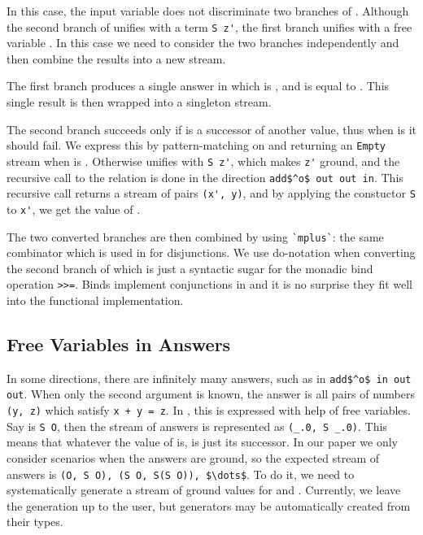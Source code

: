 In this case, the input variable \z does not discriminate two branches of \conde.
Although the second branch of \conde unifies \z with a term \lstinline{S z'}, the first branch unifies \z with a free variable \y.
In this case we need to consider the two branches independently and then combine the results into a new stream.

The first \conde branch produces a single answer in which \x is \zero, and \y is equal to \z.
This single result is then wrapped into a singleton stream.

The second \conde branch succeeds only if \z is a successor of another value, thus when \z is \zero it should fail.
We express this by pattern-matching on \z and returning an \lstinline{Empty} stream when \z is \zero.
Otherwise \z unifies with \lstinline{S z'}, which makes \lstinline{z'} ground, and the recursive call to the relation is done in the direction \lstinline{add$^o$ out out in}.
This recursive call returns a stream of pairs \lstinline{(x', y)}, and by applying the constuctor \lstinline{S} to \lstinline{x'}, we get the value of \x.

The two converted \conde branches are then combined by using \lstinline{`mplus`}: the same combinator which is used in \mk for disjunctions.
We use do-notation when converting the second branch of \conde which is just a syntactic sugar for the monadic bind operation \lstinline{>>=}.
Binds implement conjunctions in \mk and it is no surprise they fit well into the functional implementation.



\subsection{Free Variables in Answers}



In some directions, there are infinitely many answers, such as in \lstinline{add$^o$ in out out}.
When only the second argument is known, the answer is all pairs of numbers \lstinline{(y, z)} which satisfy \lstinline{x + y = z}.
In \mk, this is expressed with help of free variables.
Say \x is \lstinline{S O}, then the stream of answers is represented as \lstinline{(_.0, S _.0)}.
This means that whatever the value of \y is, \z is just its successor.
In our paper we only consider scenarios when the answers are ground, so the expected stream of answers is \lstinline{(O, S O), (S O, S(S O)), $\dots$}.
To do it, we need to systematically generate a stream of ground values for \y and \z.
Currently, we leave the generation up to the user, but generators may be automatically created from their types.


